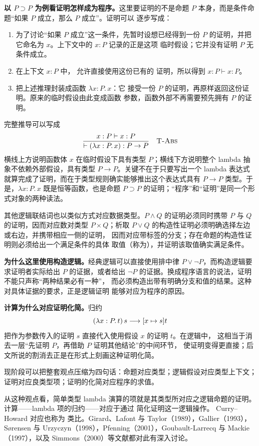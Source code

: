 {\textbf{以 \(P\supset P\) 为例看证明怎样成为程序。}这里要证明的不是命题
\(P\) 本身，而是条件命题“如果 \(P\) 成立，那么 \(P\) 成立”。证明可以
逐步写成：
\begin{enumerate}
  \item 为了讨论“如果 \(P\) 成立”这一条件，先暂时设想已经得到一份
    \(P\) 的证明，并把它命名为 \(x\)。上下文中的 \(x:P\) 记录的正是这项
    临时假设；它并没有证明 \(P\) 无条件成立。
  \item 在上下文 \(x:P\) 中， 允许直接使用这份已有的
    证明，所以得到 \(x:P\vdash x:P\)。
  \item {} 把上述推理封装成函数 \(\lambda x:P.\,x\)：它
    接受一份 \(P\) 的证明，再原样返回这份证明。原来的临时假设由此变成函数
    参数，函数外部不再需要预先拥有 \(P\) 的证明。
\end{enumerate}
完整推导可以写成
\[
\frac{x:P\vdash x:P}
     {\vdash(\lambda x:P.\,x):P\to P}
\quad\text{{\normalfont\textsc{T-Abs}}}
\]
横线上方说明函数体 \(x\) 在临时假设下具有类型 \(P\)；横线下方说明整个
lambda 抽象不依赖外部假设，具有类型 \(P\to P\)。关键不在于只要写出一个
lambda 表达式就算完成了证明，而在于类型规则确实能够推出这个表达式具有
\(P\to P\) 类型。于是，\(\lambda x:P.\,x\) 既是恒等函数，也是命题
\(P\supset P\) 的证明；“程序”和“证明”是同一个形式对象的两种读法。

其他逻辑联结词也以类似方式对应数据类型。\(P\land Q\) 的证明必须同时携带
\(P\) 与 \(Q\) 的证明，因而对应数对类型 \(P\times Q\)；析取
\(P\lor Q\) 的构造性证明必须明确选择左边或右边，并携带相应一侧的证明，
因而对应带标签的分支；存在命题的构造性证明则必须给出一个满足条件的具体
取值（称为），并证明该取值确实满足条件。

\textbf{为什么这里使用构造逻辑。}经典逻辑可以直接使用排中律
\(P\lor\neg P\)，而构造逻辑要求证明者实际给出 \(P\) 的证据，或者给出
\(\neg P\) 的证据。换成程序语言的说法，证明不能只声称“两种结果必有一种”，
而必须构造出带有明确分支和值的结果。这种对具体证据的要求，正是逻辑证明
能够对应为程序的原因。

\textbf{计算为什么对应证明化简。}归约
\[
(\lambda x:P.\,t)\,s\mathrel{\longrightarrow}[x\mapsto s]t
\]
把作为参数传入的证明 \(s\) 直接代入使用假设 \(x\) 的证明 \(t\)。在逻辑中，
这相当于消去一层“先证明 \(P\)，再借助 \(P\) 证明其他结论”的中间环节，
使证明变得更直接；后文所说的割消去正是在形式上刻画这种证明化简。

现阶段可以把整套观点压缩为四句话：命题对应类型；逻辑假设对应类型上下文；
证明对应良类型项；证明的化简对应程序的求值。}

从这种观点看，简单类型 lambda 演算的项就是其类型所对应之逻辑命题的证明。
计算——lambda 项的归约——对应于通过
 简化证明这一逻辑操作。
Curry--Howard 对应也称为
类比。Girard、Lafont 与 Taylor（1989），Gallier（1993），Sørensen 与
Urzyczyn（1998），Pfenning（2001），Goubault-Larrecq 与 Mackie
（1997），以及 Simmons（2000）等文献都对此有深入讨论。

